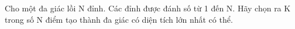 Cho một đa giác lồi N đỉnh. Các đỉnh được đánh số từ 1 đến N. Hãy chọn ra K trong số N điểm tạo thành đa giác có diện tích lớn nhất có thể.  

\